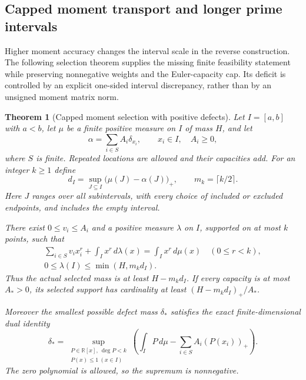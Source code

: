 \documentclass[11pt]{article}
\newtheorem{theorem}{Theorem}[section]
\theoremstyle{definition}
\begin{document}
\subsection{Capped moment transport and longer prime intervals}
\label{sec:capped-moment-transport}

Higher moment accuracy changes the interval scale in the reverse
construction. The following selection theorem supplies the missing
finite feasibility statement while preserving nonnegative weights
and the Euler-capacity cap. Its deficit is controlled by an explicit
one-sided interval discrepancy, rather than by an unsigned moment
matrix norm.

\begin{theorem}[Capped moment selection with positive defects]
\label{thm:capped-positive-moment-selection}
Let $I=[a,b]$ with $a<b$, let $\mu$ be a finite positive measure on
$I$ of mass $H$, and let
\[
 \alpha=\sum_{i\in S}A_i\delta_{x_i},\qquad
 x_i\in I,\quad A_i\ge0,
\]
where $S$ is finite. Repeated locations are allowed and their
capacities add. For an integer $k\ge1$ define
\begin{equation}
 d_I=\sup_{J\subseteq I}
                 \bigl(\mu(J)-\alpha(J)\bigr)_+,\qquad
 m_k=\lceil k/2\rceil.
 \label{eq:moment-one-sided-interval-deficit}
\end{equation}
Here $J$ ranges over all subintervals, with every choice of included
or excluded endpoints, and includes the empty interval.

There exist $0\le v_i\le A_i$ and a positive measure $\lambda$ on
$I$, supported on at most $k$ points, such that
\begin{equation}
 \begin{gathered}
 \sum_{i\in S}v_i x_i^r+\int_I x^r\,d\lambda(x)
      =\int_I x^r\,d\mu(x)\quad(0\le r<k),\\
 0\le\lambda(I)\le\min(H,m_k d_I).
 \end{gathered}
 \label{eq:capped-moment-defect}
\end{equation}
Thus the actual selected mass is at least $H-m_kd_I$.
If every capacity is at most $A_*>0$, its selected support has
cardinality at least $(H-m_kd_I)_+/A_*$.

Moreover the smallest possible defect mass $\delta_*$ satisfies
the exact finite-dimensional dual identity
\begin{equation}
 \delta_*=
 \sup_{\substack{P\in\mathbb R[x],\ \deg P<k\\
                         P(x)\le1\ (x\in I)}}
       \left(\int_I P\,d\mu
                    -\sum_{i\in S}A_i(P(x_i))_+\right).
 \label{eq:capped-moment-dual}
\end{equation}
The zero polynomial is allowed, so the supremum is nonnegative.
\end{theorem}
\end{document}
